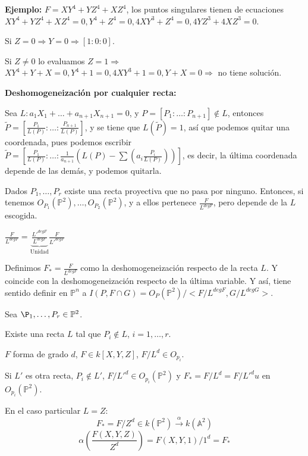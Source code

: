 \textbf{Ejemplo:} $F=XY^4+YZ^4+XZ^4$, los puntos singulares tienen de ecuaciones $XY^4+YZ^4+XZ^4=0, Y^4+Z^4=0, 4XY^3+Z^4=0,4YZ^3+4XZ^3=0$.

Si $Z=0 \Rightarrow Y=0 \Rightarrow [1:0:0]$.

Si $Z\neq 0$ lo evaluamos $Z=1 \Rightarrow $ $XY^4+Y+X=0, Y^4+1=0, 4XY^3+1=0,Y+X=0 \Rightarrow $ no tiene solución.


\textbf{Deshomogeneización por cualquier recta:}

Sea $L:a_1X_1+\dots + a_{n+1}X_{n+1}=0$, y $P=[P_1:\dots : P_{n+1}]\notin L$, entonces $\tilde{P}=[\frac{P_1}{L(P)}:\dots : \frac{P_{n+1}}{L(P)}]$, y se tiene que $L(\tilde{P})=1$, así que podemos quitar una coordenada, pues podemos escribir $\tilde{P}=[\frac{P_1}{L(P)}:\dots : \frac{1}{a_{n+1}}(L(P)-\sum (a_i\frac{P_i}{L(P)}))]$, es decir, la última coordenada depende de las demás, y podemos quitarla. 

Dados $P_1,\dots , P_r$ existe una recta proyectiva que no pasa por ninguno. Entonces, si tenemos $O_{P_1}(\mathbb{P}^2), \dots ,O_{P_2}(\mathbb{P}^2)$, y a ellos pertenece $\frac{F}{L^{deg F}}$, pero depende de la $L$ escogida. 

\begin{nota}
$\frac{F}{L^{deg F}}=\underbrace{\frac{L'^{deg F}}{L^{deg F}}}_{\text{Unidad}}\frac{F}{L'^{deg F}}$
\end{nota}

Definimos $F_*=\frac{F}{L^{deg F}}$ como la deshomogeneización respecto de la recta $L$. Y coincide con la deshomogeneización respecto de la última variable. Y así, tiene sentido definir en $\mathbb{P}^n$ a $I(P,F\cap G)=O_P(\mathbb{P}^2)/<F/L^{deg F},G/L^{deg G}>$.

\begin{nota}
Sea $\P_1,\dots , P_r \in \mathbb{P}^2$.
\begin{itemize*}
\item Existe una recta $L$ tal que $P_i\notin L$, $i=1,\dots , r$.
\item $F$ forma de grado $d$, $F\in k[X,Y,Z]$, $F/L^d\in O_{p_i}$.
\item Si $L'$ es otra recta, $P_i\notin L'$, $F/L'^d\in O_{p_i}(\mathbb{P}^2)$ y $F_*= F/L^d=F/L'^du $ en $O_{p_i}(\mathbb{P}^2)$. 
\end{itemize*}
\end{nota}

En el caso particular $L=Z$:
$$F_*=F/Z^d\in k(\mathbb{P}^2)\xrightarrow{\alpha } k(\mathbb{A}^2) $$
$$\alpha (\frac{F(X,Y,Z)}{Z^d})=F(X,Y,1)/1^d=F_*$$

